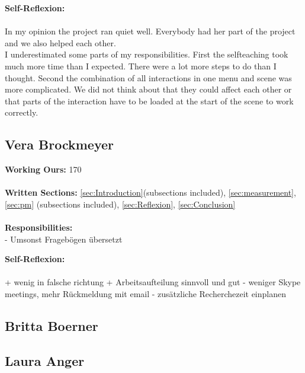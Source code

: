 \textbf{Self-Reflexion:}\\ \\
In my opinion the project ran quiet well. Everybody had her part of the project and we also helped each other.\\
I underestimated some parts of my responsibilities. First the selfteaching took much  more time than I expected. There were a lot more steps to do than I thought. Second the combination of all interactions in one menu and scene was more complicated. We did not think about that they could affect each other or that parts of the interaction have to be loaded at the start of the scene to work correctly.\\

\subsection{Vera Brockmeyer} \label{sec:SAVera}


\textbf{Working Ours:} 170 \\ \\
\textbf{Written Sections: }\ref{sec:Introduction}(subsections included),  \ref{sec:measurement}, \ref{sec:pm} (subsections included), \ref{sec:Reflexion}, \ref{sec:Conclusion} \\ \\
\textbf{Responsibilities:}\\ 
- Umsonst Fragebögen übersetzt

\textbf{Self-Reflexion:}\\ \\
+ wenig in falsche richtung
+ Arbeitsaufteilung sinnvoll und gut
- weniger Skype meetings, mehr Rückmeldung mit email
- zusätzliche Recherchezeit einplanen

\subsection{Britta Boerner} \label{sec:SABritta}

\newpage
\subsection{Laura Anger} \label{sec:SALaura}

